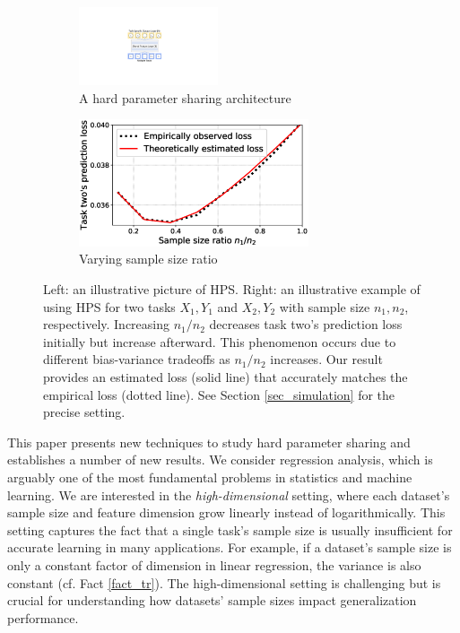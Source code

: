 \documentclass[aos,preprint]{imsart}
\begin{document}
\begin{figure}[!t]
	\begin{subfigure}[t]{0.5\textwidth}
		\centering
		\includegraphics[width=0.45\textwidth,valign=t]{figures/mtl_model_arch.pdf}
		\caption{A hard parameter sharing architecture}
		\label{fig_intro_arch}
	\end{subfigure}\hfill
	\begin{subfigure}[t]{0.5\textwidth}
		\centering
		\includegraphics[width=0.745\textwidth,valign=t]{figures/sample_ratio_c2_400.eps}
		\caption{Varying sample size ratio}
		\label{fig_intro_sample_size_b}
	\end{subfigure}
	\vspace{-0.1in}
	\caption{
	Left: an illustrative picture of HPS.
	Right: an illustrative example of using HPS for two tasks $X_1, Y_1$ and $X_2, Y_2$ with sample size $n_1, n_2$, respectively.
	Increasing $n_1/n_2$ decreases task two's prediction loss initially but increase afterward. This phenomenon occurs due to different bias-variance tradeoffs as $n_1/n_2$ increases. Our result provides an estimated loss (solid line) that accurately matches the empirical loss (dotted line).
	See Section \ref{sec_simulation} for the precise setting.}
	\label{fig_intro_sample_size}
\end{figure}



This paper presents new techniques to study hard parameter sharing and establishes a number of new results.
We consider regression analysis, which is arguably one of the most fundamental problems in statistics and machine learning.
We are interested in the \textit{high-dimensional} setting, where each dataset's sample size and feature dimension grow linearly instead of logarithmically.
This setting captures the fact that a single task's sample size is usually insufficient for accurate learning in many applications.
For example, if a dataset's sample size is only a constant factor of dimension in linear regression, the variance is also constant (cf. Fact \ref{fact_tr}).
The high-dimensional setting is challenging but is crucial for understanding how datasets' sample sizes impact generalization performance.
\end{document}
